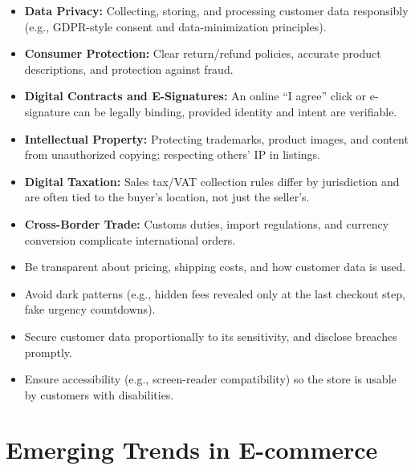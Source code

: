 \documentclass[11pt,a4paper]{article}
\begin{document}
\begin{alertbox}
\begin{itemize}[leftmargin=*]
  \item \textbf{Data Privacy:} Collecting, storing, and processing customer data responsibly (e.g., GDPR-style consent and data-minimization principles).
  \item \textbf{Consumer Protection:} Clear return/refund policies, accurate product descriptions, and protection against fraud.
  \item \textbf{Digital Contracts and E-Signatures:} An online ``I agree'' click or e-signature can be legally binding, provided identity and intent are verifiable.
  \item \textbf{Intellectual Property:} Protecting trademarks, product images, and content from unauthorized copying; respecting others' IP in listings.
  \item \textbf{Digital Taxation:} Sales tax/VAT collection rules differ by jurisdiction and are often tied to the buyer's location, not just the seller's.
  \item \textbf{Cross-Border Trade:} Customs duties, import regulations, and currency conversion complicate international orders.
\end{itemize}
\end{alertbox}

\begin{conceptbox}
\begin{itemize}[leftmargin=*]
  \item Be transparent about pricing, shipping costs, and how customer data is used.
  \item Avoid dark patterns (e.g., hidden fees revealed only at the last checkout step, fake urgency countdowns).
  \item Secure customer data proportionally to its sensitivity, and disclose breaches promptly.
  \item Ensure accessibility (e.g., screen-reader compatibility) so the store is usable by customers with disabilities.
\end{itemize}
\end{conceptbox}

\section{Emerging Trends in E-commerce}
\end{document}

